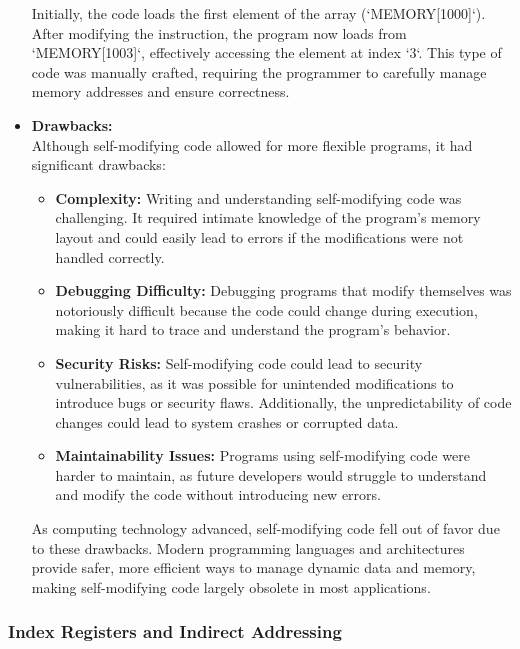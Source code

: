 \documentclass{book}
\begin{document}
\begin{itemize}
		Initially, the code loads the first element of the array (`MEMORY[1000]`). After modifying the instruction, the program now loads from `MEMORY[1003]`, effectively accessing the element at index `3`. This type of code was manually crafted, requiring the programmer to carefully manage memory addresses and ensure correctness.
		
		\item \textbf{Drawbacks:} \\
		Although self-modifying code allowed for more flexible programs, it had significant drawbacks:
		\begin{itemize}
			\item \textbf{Complexity:} Writing and understanding self-modifying code was challenging. It required intimate knowledge of the program's memory layout and could easily lead to errors if the modifications were not handled correctly.
			\item \textbf{Debugging Difficulty:} Debugging programs that modify themselves was notoriously difficult because the code could change during execution, making it hard to trace and understand the program's behavior.
			\item \textbf{Security Risks:} Self-modifying code could lead to security vulnerabilities, as it was possible for unintended modifications to introduce bugs or security flaws. Additionally, the unpredictability of code changes could lead to system crashes or corrupted data.
			\item \textbf{Maintainability Issues:} Programs using self-modifying code were harder to maintain, as future developers would struggle to understand and modify the code without introducing new errors.
		\end{itemize}
		
		As computing technology advanced, self-modifying code fell out of favor due to these drawbacks. Modern programming languages and architectures provide safer, more efficient ways to manage dynamic data and memory, making self-modifying code largely obsolete in most applications.
	\end{itemize}
	\subsubsection{Index Registers and Indirect Addressing}
		
\end{document}

